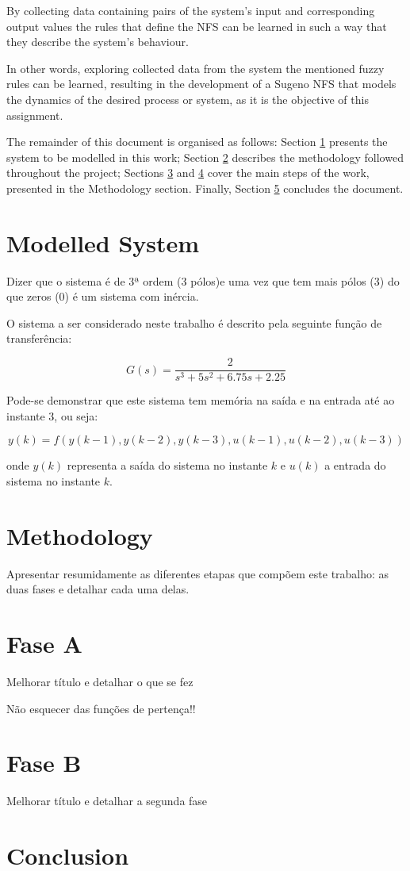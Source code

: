 \documentclass[11pt]{article}
\begin{document}
By collecting data containing pairs of the system's input and corresponding output values the rules that define the NFS can be learned in such a way that they describe the system's behaviour.

In other words, exploring collected data from the system the mentioned fuzzy rules can be learned, resulting in the development of a Sugeno NFS that models the dynamics of the desired process or system, as it is the objective of this assignment.

The remainder of this document is organised as follows: Section \ref{modelled_system} presents the system to be modelled in this work; Section \ref{methodology} describes the methodology followed throughout the project; Sections \ref{fase_a} and \ref{fase_b} cover the main steps of the work, presented in the Methodology section. Finally, Section \ref{conclusion} concludes the document.


\section{Modelled System}
\label{modelled_system}

Dizer que o sistema é de 3ª ordem (3 pólos)e uma vez que tem mais pólos (3) do que zeros (0) é um sistema com inércia.

O sistema a ser considerado neste trabalho é descrito pela seguinte função de transferência:

$$ G(s) = \frac{2}{s^{3} + 5s^{2} + 6.75s + 2.25}$$

Pode-se demonstrar que este sistema tem memória na saída e na entrada até ao instante 3, ou seja:

$$ y(k) = f(y(k-1), y(k-2), y(k-3), u(k-1), u(k-2),u(k-3))$$

onde $y(k)$ representa a saída do sistema no instante $k$ e $u(k)$ a entrada do sistema no instante $k$.

\section{Methodology}
\label{methodology}

Apresentar resumidamente as diferentes etapas que compõem este trabalho: as duas fases e detalhar cada uma delas.

\section{Fase A}
\label{fase_a}

Melhorar título e detalhar o que se fez

Não esquecer das funções de pertença!!

\section{Fase B}
\label{fase_b}

Melhorar título e detalhar a segunda fase


\section{Conclusion}
\label{conclusion}
\end{document}
